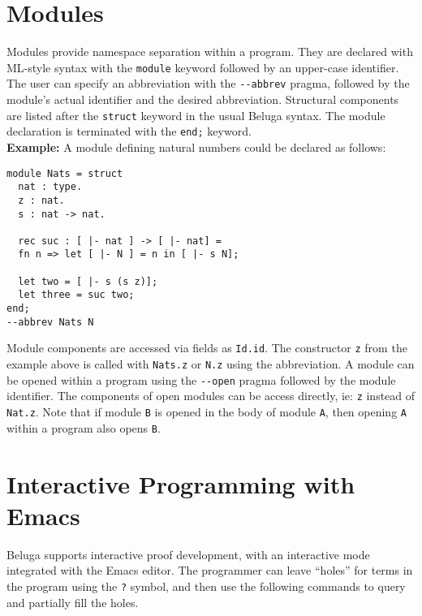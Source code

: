 \documentclass[11pt]{article}
\begin{document}


\section{Modules}
Modules provide namespace separation within a program. They are declared with ML-style syntax with the \texttt{module} keyword followed by an upper-case identifier. The user can specify an abbreviation with the \texttt{-{}-abbrev} pragma, followed by the module's actual identifier and the desired abbreviation. Structural components are listed after the \texttt{struct} keyword in the usual Beluga syntax. The module declaration is terminated with the \texttt{end;} keyword. \\

\textbf{Example:} A module defining natural numbers could be declared as follows:
\begin{verbatim} 
module Nats = struct  
  nat : type.
  z : nat.
  s : nat -> nat.

  rec suc : [ |- nat ] -> [ |- nat] =
  fn n => let [ |- N ] = n in [ |- s N];

  let two = [ |- s (s z)];
  let three = suc two;
end;
--abbrev Nats N
\end{verbatim}

Module components are accessed via fields as \texttt{Id.id}. The constructor \texttt{z} from the example above is called with \texttt{Nats.z} or \texttt{N.z} using the abbreviation. A module can be opened within a program using the \texttt{-{}-open} pragma followed by the module identifier. The components of open modules can be access directly, ie: \texttt{z} instead of \texttt{Nat.z}. Note that if module \texttt{B} is opened in the body of module \texttt{A}, then opening \texttt{A} within a program also opens \texttt{B}.


\section{Interactive Programming with Emacs}
Beluga supports interactive proof development, with an interactive mode integrated with the Emacs editor. The programmer can leave ``holes'' for terms in the program using the \texttt{?} symbol, and then use the following commands to query and partially fill the holes.
\end{document}
